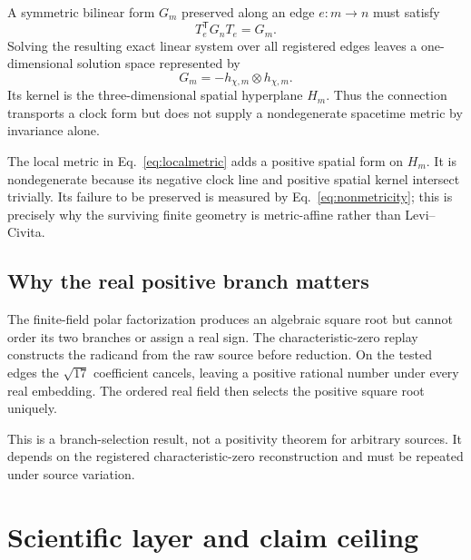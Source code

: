 \documentclass[12pt,a4paper,twoside]{article}
\begin{document}
A symmetric bilinear form $G_m$ preserved along an edge $e:m\to n$ must satisfy
\begin{equation}
T_e^{\mathsf T}G_nT_e=G_m.
\end{equation}
Solving the resulting exact linear system over all registered edges leaves a one-dimensional solution space represented by
\begin{equation}
G_m=-h_{\chi,m}\otimes h_{\chi,m}.
\end{equation}
Its kernel is the three-dimensional spatial hyperplane $H_m$. Thus the connection transports a clock form but does not supply a nondegenerate spacetime metric by invariance alone.

The local metric in Eq.~\eqref{eq:localmetric} adds a positive spatial form on $H_m$. It is nondegenerate because its negative clock line and positive spatial kernel intersect trivially. Its failure to be preserved is measured by Eq.~\eqref{eq:nonmetricity}; this is precisely why the surviving finite geometry is metric-affine rather than Levi--Civita.

\subsection{Why the real positive branch matters}

The finite-field polar factorization produces an algebraic square root but cannot order its two branches or assign a real sign. The characteristic-zero replay constructs the radicand from the raw source before reduction. On the tested edges the $\sqrt{17}$ coefficient cancels, leaving a positive rational number under every real embedding. The ordered real field then selects the positive square root uniquely.

This is a branch-selection result, not a positivity theorem for arbitrary sources. It depends on the registered characteristic-zero reconstruction and must be repeated under source variation.

\section{Scientific layer and claim ceiling}
\end{document}
